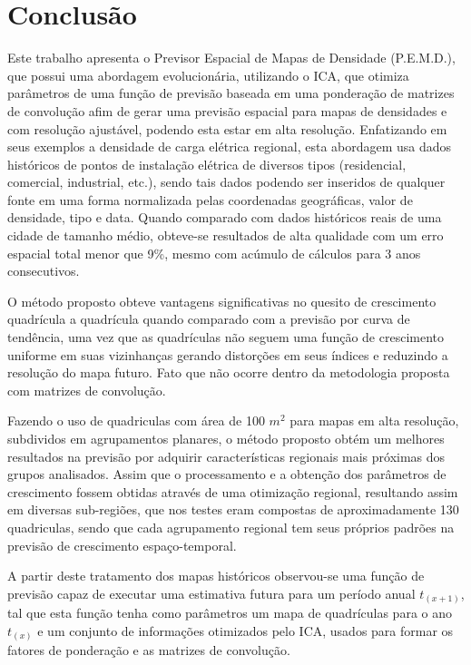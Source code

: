\chapter{Conclusão}
\label{conclusao}

Este trabalho apresenta o Previsor Espacial de Mapas de Densidade (P.E.M.D.), que possui uma abordagem evolucionária, utilizando o ICA, que otimiza parâmetros de uma função de previsão baseada em uma ponderação de matrizes de convolução afim de gerar uma previsão espacial para mapas de densidades e com resolução ajustável, podendo esta estar em alta resolução. Enfatizando em seus exemplos a densidade de carga elétrica regional, esta abordagem usa dados históricos de pontos de instalação elétrica de diversos tipos (residencial, comercial, industrial, etc.), sendo tais dados podendo ser inseridos de qualquer fonte em uma forma normalizada pelas coordenadas geográficas, valor de densidade, tipo e data. Quando comparado com dados históricos reais de uma cidade de tamanho médio, obteve-se resultados de alta qualidade com um erro espacial total menor que 9\%, mesmo com acúmulo de cálculos para 3 anos consecutivos. 

O método proposto obteve vantagens significativas no quesito de crescimento quadrícula a quadrícula quando comparado com a previsão por curva de tendência, uma vez que as quadrículas não seguem uma função de crescimento uniforme em suas vizinhanças gerando distorções em seus índices e reduzindo a resolução do mapa futuro. Fato que não ocorre dentro da metodologia proposta com matrizes de convolução.

Fazendo o uso de quadriculas com área de 100 \(m^2\) para mapas em alta resolução, subdividos em agrupamentos planares, o método proposto obtém um melhores resultados na previsão por adquirir características regionais mais próximas dos grupos analisados. Assim que o processamento e a obtenção dos parâmetros de crescimento fossem obtidas através de uma otimização regional, resultando assim em diversas sub-regiões, que nos testes eram compostas de aproximadamente 130 quadriculas, sendo que cada agrupamento regional tem seus próprios padrões na previsão de crescimento espaço-temporal.

A partir deste tratamento dos mapas históricos observou-se uma função de previsão capaz de executar uma estimativa futura para um período anual \(t_{(x+1)}\), tal que esta função tenha como parâmetros um mapa de quadrículas para o ano \(t_{(x)}\) e um conjunto de informações otimizados pelo ICA, usados para formar os fatores de ponderação e as matrizes de convolução.  

